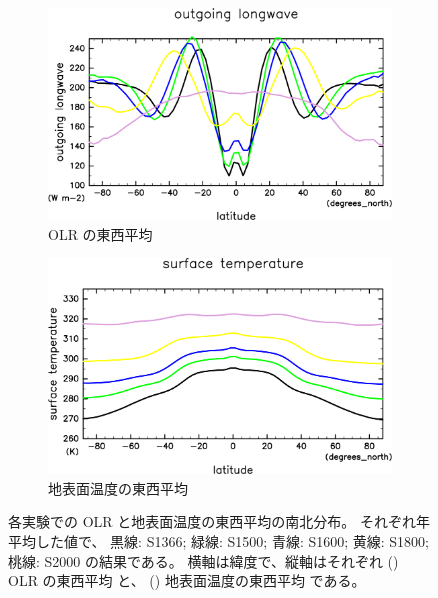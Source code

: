 \documentclass[body]{subfiles}
\begin{document}
\begin{figure}[t]
	\centering
	\begin{subfigure}{.45\textwidth}
		\centering
		\includegraphics[width=\textwidth]{OLR-overplot-crop-rotate.pdf}
		\caption{OLR の東西平均}\label{OLRA東西平均}
	\end{subfigure}
	\hfill
	\begin{subfigure}{.45\textwidth}
		\centering
		\includegraphics[width=\textwidth]{SurfTemp-overplot-crop-rotate.pdf}
		\caption{地表面温度の東西平均}\label{地表面温度}
	\end{subfigure}
	\caption[各実験での OLR と地表面温度の東西平均]{
		各実験での OLR と地表面温度の東西平均の南北分布。
		それぞれ年平均した値で、
		黒線: S1366; 緑線: S1500; 青線: S1600; 黄線: S1800; 桃線: S2000 の結果である。
		横軸は緯度で、縦軸はそれぞれ () OLR の東西平均 \hmu*{[W/m^2]}と、
		() 地表面温度の東西平均 \hmu*{[K]} である。
	}
\end{figure}
\end{document}
